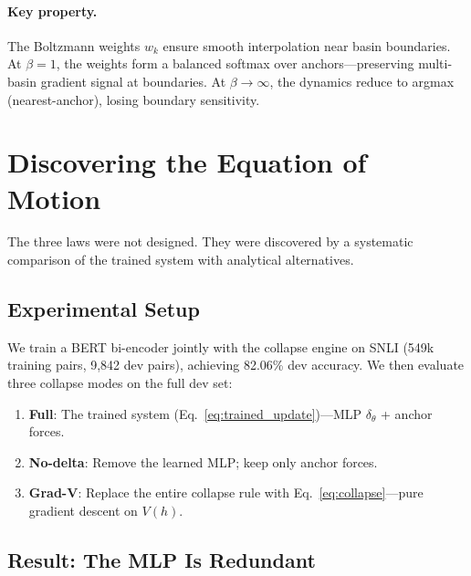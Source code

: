 \documentclass[11pt]{article}
\begin{document}
\paragraph{Key property.} The Boltzmann weights $w_k$ ensure smooth
interpolation near basin boundaries. At $\beta = 1$, the weights form
a balanced softmax over anchors---preserving multi-basin gradient signal
at boundaries. At $\beta \to \infty$, the dynamics reduce to argmax
(nearest-anchor), losing boundary sensitivity.

\section{Discovering the Equation of Motion}
\label{sec:discovery}

The three laws were not designed. They were discovered by a systematic
comparison of the trained system with analytical alternatives.

\subsection{Experimental Setup}

We train a BERT bi-encoder jointly with the collapse engine on SNLI
(549k training pairs, 9,842 dev pairs), achieving 82.06\% dev accuracy.
We then evaluate three collapse modes on the full dev set:

\begin{enumerate}
    \item \textbf{Full}: The trained system (Eq.~\ref{eq:trained_update})---MLP $\delta_\theta$ + anchor forces.
    \item \textbf{No-delta}: Remove the learned MLP; keep only anchor forces.
    \item \textbf{Grad-V}: Replace the entire collapse rule with Eq.~\ref{eq:collapse}---pure gradient descent on $V(h)$.
\end{enumerate}

\subsection{Result: The MLP Is Redundant}
\end{document}
